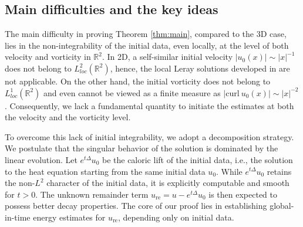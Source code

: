 \documentclass[12pt]{amsart}
\numberwithin{equation}{section}              %
\theoremstyle{remark}
\begin{document}
	
	
	
	
    

    
	
	\subsection{Main difficulties and the key ideas}
	The main difficulty in proving Theorem \ref{thm:main}, compared to the 3D case, lies in the non-integrability of the initial data, even locally, at the level of both velocity and vorticity in $\mathbb{R}^2$. In 2D, a self-similar initial velocity  $|u_0(x)| \sim |x|^{-1}$ does not belong to $L_{loc}^{2}(\mathbb{R}^{2})$, 
	hence, the local Leray solutions developed  in \cite{Lemarie02} are not applicable.
	On the other hand,  the initial vorticity does not belong to $L_{loc}^{1}(\mathbb{R}^{2})$ and even cannot be viewed as a finite measure as $|\textrm{curl} ~u_0(x)| \sim |x|^{-2}$. Consequently, we lack a fundamental quantity to initiate the estimates at both the velocity and the vorticity level.
	
	To overcome this lack of initial integrability, we adopt a decomposition strategy. We postulate that the singular behavior of the solution is dominated by the linear evolution. Let $ e^{t\Delta}u_0$ be the caloric lift of the initial data, i.e., the solution to the heat equation starting from the same initial data $u_0$. While $ e^{t\Delta}u_0$ retains the non-$L^2$ character of the initial data, it is explicitly computable and smooth for $t > 0$. The unknown remainder term $u_{\text{re}} = u -  e^{t\Delta}u_0$ is then expected to possess better  decay properties. 
     The core of our proof lies in establishing global-in-time energy estimates for $u_{\text{re}}$, depending only on initial data. 
   
\end{document}
